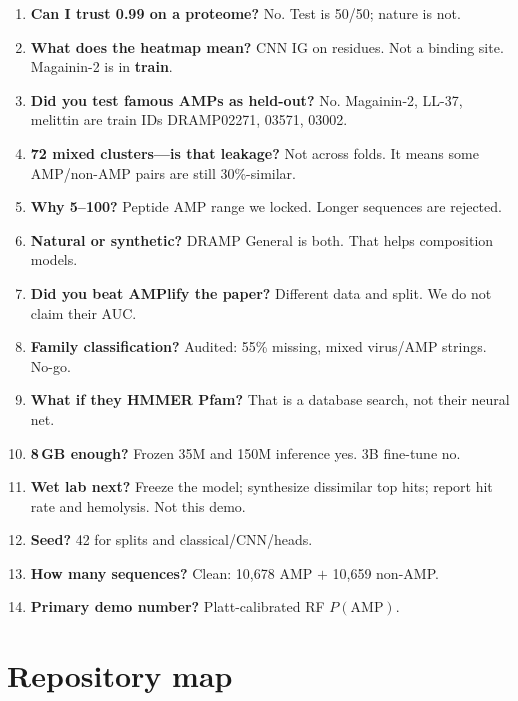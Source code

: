 \documentclass[11pt,a4paper]{report}
\begin{document}
\begin{enumerate}[leftmargin=1.6em]
\item \textbf{Can I trust 0.99 on a proteome?} No. Test is 50/50; nature is not.

\item \textbf{What does the heatmap mean?} CNN IG on residues. Not a binding site. Magainin-2 is in \textbf{train}.

\item \textbf{Did you test famous AMPs as held-out?} No. Magainin-2, LL-37, melittin are train IDs DRAMP02271, 03571, 03002.

\item \textbf{72 mixed clusters---is that leakage?} Not across folds. It means some AMP/non-AMP pairs are still 30\%-similar.

\item \textbf{Why 5--100?} Peptide AMP range we locked. Longer sequences are rejected.

\item \textbf{Natural or synthetic?} DRAMP General is both. That helps composition models.

\item \textbf{Did you beat AMPlify the paper?} Different data and split. We do not claim their AUC.

\item \textbf{Family classification?} Audited: 55\% missing, mixed virus/AMP strings. No-go.

\item \textbf{What if they HMMER Pfam?} That is a database search, not their neural net.

\item \textbf{8\,GB enough?} Frozen 35M and 150M inference yes. 3B fine-tune no.

\item \textbf{Wet lab next?} Freeze the model; synthesize dissimilar top hits; report hit rate and hemolysis. Not this demo.

\item \textbf{Seed?} 42 for splits and classical/CNN/heads.

\item \textbf{How many sequences?} Clean: 10{,}678 AMP $+$ 10{,}659 non-AMP.

\item \textbf{Primary demo number?} Platt-calibrated RF $P(\mathrm{AMP})$.
\end{enumerate}

\chapter{Repository map}
\label{ch:repo}
\end{document}
